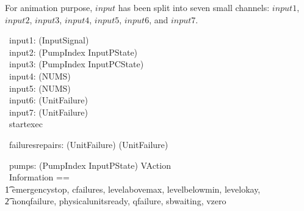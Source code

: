 \documentclass{report} %
\begin{document}
For animation purpose, $input$ has been split into seven small channels: $input1$, $input2$, $input3$, $input4$, $input5$, $input6$, and $input7$.
\begin{circus}


  \circchannel\ input1: (\power InputSignal) \\
  \circchannel\ input2: (PumpIndex \fun InputPState) \\ %
  \circchannel\ input3: (PumpIndex \fun InputPCState) \\ %
  \circchannel\ input4: (NUMS) \\ %
  \circchannel\ input5: (NUMS) \\ %
  \circchannel\ input6: (\power UnitFailure) \\ %
  \circchannel\ input7: (\power UnitFailure) \\ %

  \circchannel\ startexec \\ 
\end{circus}

\begin{circus}
   \circchannel\ failuresrepairs: (\power UnitFailure) \cross (\power UnitFailure)
\end{circus}

\begin{circus}
  \circchannel\ pumps: (PumpIndex \fun InputPState) \cross VAction \\
  \circchannelset\ Information ==  \\ \t1
    \lchanset emergencystop, cfailures, levelabovemax, levelbelowmin, levelokay, \\ \t2
              nonqfailure, physicalunitsready, qfailure, sbwaiting, vzero \rchanset
\end{circus}
\end{document}
